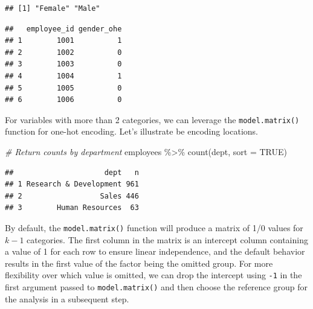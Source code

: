 \documentclass[
]{book}
\newenvironment{Shaded}{\begin{snugshade}}{\end{snugshade}}
\newcommand{\AttributeTok}[1]{\textcolor[rgb]{0.77,0.63,0.00}{#1}}
\newcommand{\CommentTok}[1]{\textcolor[rgb]{0.56,0.35,0.01}{\textit{#1}}}
\newcommand{\ConstantTok}[1]{\textcolor[rgb]{0.00,0.00,0.00}{#1}}
\newcommand{\DecValTok}[1]{\textcolor[rgb]{0.00,0.00,0.81}{#1}}
\newcommand{\FunctionTok}[1]{\textcolor[rgb]{0.00,0.00,0.00}{#1}}
\newcommand{\NormalTok}[1]{#1}
\newcommand{\OtherTok}[1]{\textcolor[rgb]{0.56,0.35,0.01}{#1}}
\newcommand{\SpecialCharTok}[1]{\textcolor[rgb]{0.00,0.00,0.00}{#1}}
\newcommand{\StringTok}[1]{\textcolor[rgb]{0.31,0.60,0.02}{#1}}
\begin{document}
\begin{verbatim}
## [1] "Female" "Male"
\end{verbatim}

\begin{Shaded}
\end{Shaded}

\begin{verbatim}
##   employee_id gender_ohe
## 1        1001          1
## 2        1002          0
## 3        1003          0
## 4        1004          1
## 5        1005          0
## 6        1006          0
\end{verbatim}

For variables with more than 2 categories, we can leverage the \texttt{model.matrix()} function for one-hot encoding. Let's illustrate be encoding locations.

\begin{Shaded}
\begin{Highlighting}[]
\CommentTok{\# Return counts by department}
\NormalTok{employees }\SpecialCharTok{\%\textgreater{}\%} \FunctionTok{count}\NormalTok{(dept, }\AttributeTok{sort =} \ConstantTok{TRUE}\NormalTok{)}
\end{Highlighting}
\end{Shaded}

\begin{verbatim}
##                     dept   n
## 1 Research & Development 961
## 2                  Sales 446
## 3        Human Resources  63
\end{verbatim}

By default, the \texttt{model.matrix()} function will produce a matrix of 1/0 values for \(k-1\) categories. The first column in the matrix is an intercept column containing a value of 1 for each row to ensure linear independence, and the default behavior results in the first value of the factor being the omitted group. For more flexibility over which value is omitted, we can drop the intercept using \texttt{-1} in the first argument passed to \texttt{model.matrix()} and then choose the reference group for the analysis in a subsequent step.
\end{document}

